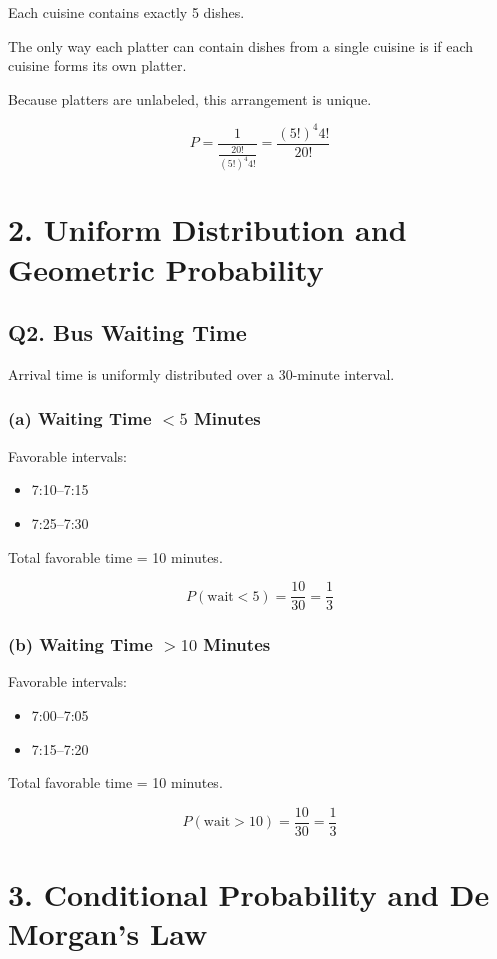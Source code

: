 \documentclass[12pt]{article}
\begin{document}
Each cuisine contains exactly 5 dishes.

The only way each platter can contain dishes from a single cuisine is if each cuisine forms its own platter.

Because platters are unlabeled, this arrangement is unique.

\[
P =
\frac{1}{\frac{20!}{(5!)^4 4!}}
=
\frac{(5!)^4 4!}{20!}
\]

\section*{2. Uniform Distribution and Geometric Probability}

\subsection*{Q2. Bus Waiting Time}

Arrival time is uniformly distributed over a 30-minute interval.

\subsubsection*{(a) Waiting Time $< 5$ Minutes}

Favorable intervals:
\begin{itemize}
    \item 7:10–7:15
    \item 7:25–7:30
\end{itemize}

Total favorable time = 10 minutes.

\[
P(\text{wait} < 5) = \frac{10}{30} = \frac{1}{3}
\]

\subsubsection*{(b) Waiting Time $> 10$ Minutes}

Favorable intervals:
\begin{itemize}
    \item 7:00–7:05
    \item 7:15–7:20
\end{itemize}

Total favorable time = 10 minutes.

\[
P(\text{wait} > 10) = \frac{10}{30} = \frac{1}{3}
\]

\section*{3. Conditional Probability and De Morgan’s Law}
\end{document}
